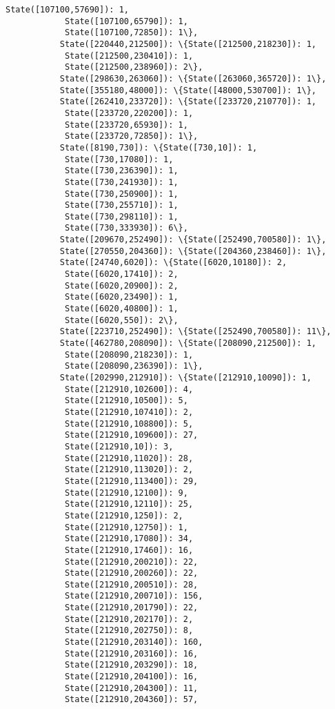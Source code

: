\documentclass[11pt]{article}
\begin{document}
\begin{Verbatim}[commandchars=\\\{\}]
            State([107100,57690]): 1,
            State([107100,65790]): 1,
            State([107100,72850]): 1\},
           State([220440,212500]): \{State([212500,218230]): 1,
            State([212500,230410]): 1,
            State([212500,238960]): 2\},
           State([298630,263060]): \{State([263060,365720]): 1\},
           State([355180,48000]): \{State([48000,530700]): 1\},
           State([262410,233720]): \{State([233720,210770]): 1,
            State([233720,220200]): 1,
            State([233720,65930]): 1,
            State([233720,72850]): 1\},
           State([8190,730]): \{State([730,10]): 1,
            State([730,17080]): 1,
            State([730,236390]): 1,
            State([730,241930]): 1,
            State([730,250900]): 1,
            State([730,255710]): 1,
            State([730,298110]): 1,
            State([730,333930]): 6\},
           State([209670,252490]): \{State([252490,700580]): 1\},
           State([270550,204360]): \{State([204360,238460]): 1\},
           State([24740,6020]): \{State([6020,10180]): 2,
            State([6020,17410]): 2,
            State([6020,20900]): 2,
            State([6020,23490]): 1,
            State([6020,40800]): 1,
            State([6020,550]): 2\},
           State([223710,252490]): \{State([252490,700580]): 11\},
           State([462780,208090]): \{State([208090,212500]): 1,
            State([208090,218230]): 1,
            State([208090,236390]): 1\},
           State([202990,212910]): \{State([212910,10090]): 1,
            State([212910,102600]): 4,
            State([212910,10500]): 5,
            State([212910,107410]): 2,
            State([212910,108800]): 5,
            State([212910,109600]): 27,
            State([212910,10]): 3,
            State([212910,11020]): 28,
            State([212910,113020]): 2,
            State([212910,113400]): 29,
            State([212910,12100]): 9,
            State([212910,12110]): 25,
            State([212910,1250]): 2,
            State([212910,12750]): 1,
            State([212910,17080]): 34,
            State([212910,17460]): 16,
            State([212910,200210]): 22,
            State([212910,200260]): 22,
            State([212910,200510]): 28,
            State([212910,200710]): 156,
            State([212910,201790]): 22,
            State([212910,202170]): 2,
            State([212910,202750]): 8,
            State([212910,203140]): 160,
            State([212910,203160]): 16,
            State([212910,203290]): 18,
            State([212910,204100]): 16,
            State([212910,204300]): 11,
            State([212910,204360]): 57,

\end{Verbatim}
\end{document}
